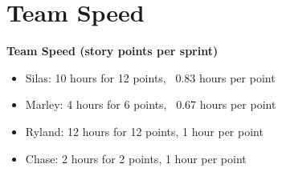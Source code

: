 \section{Team Speed}
\textbf{Team Speed (story points per sprint)}
\begin{itemize}
    \item Silas: 10 hours for 12 points, ~0.83 hours per point
    \item Marley: 4 hours for 6 points, ~0.67 hours per point
    \item Ryland: 12 hours for 12 points, 1 hour per point
    \item Chase: 2 hours for 2 points, 1 hour per point
\end{itemize}
